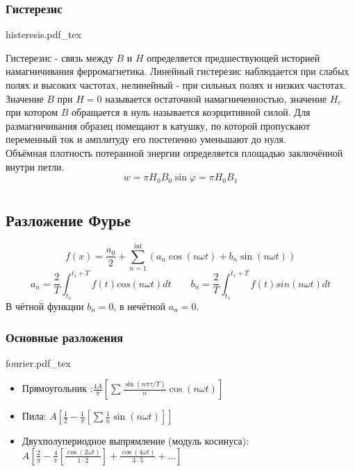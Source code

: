 \documentclass{article}
\newcommand{\incfig}[2][1]{%
    \def\svgwidth{#1\columnwidth}
    {#2.pdf_tex}
}
\begin{document}
\subsubsection{Гистерезис}
\incfig{histeresis}
Гистерезис - связь между $B$ и $H$ определяется предшествующей историей намагничивания ферромагнетика.
Линейный гистерезис наблюдается при слабых полях и высоких частотах, нелинейный - при сильных полях и низких частотах.
Значение $B$ при $H=0$ называется остаточной намагниченностью, значение $H_c$ при котором $B$ обращается в нуль называется коэрцитивной силой.
Для размагничивания образец помещают в катушку, по которой пропускают переменный ток и амплитуду его постепенно уменьшают до нуля.\\
Объёмная плотность потеранной энергии определяется площадью заключённой внутри петли.
\[w=\pi H_0B_0 \sin \varphi=\pi H_0B_1\]

\section{}
\subsection{Разложение Фурье}
\[f(x)=\frac{a_0}{2} + \sum_{n=1}^{\inf}(a_n \cos (n \omega t) + b_n \sin (n \omega t))\]
\[a_n = \frac{2}{T}\int_{t_1}^{t_1+T}f(t)cos(n\omega t)dt \qquad b_n = \frac{2}{T}\int_{t_1}^{t_1+T}f(t)sin(n\omega t)dt\]
В чётной функции $b_n=0$, в нечётной $a_n=0$.
\subsubsection{Основные разложения}
\incfig{fourier}
\begin{itemize}
    \item Прямоугольник :$\frac{4A}{\pi}[\sum\frac{\sin(n\pi\tau/T)}{n}\cos(n\omega t)]$
    \item Пила: $A[\frac{1}{2}-\frac{1}{\pi}[\sum \frac{1}{n} \sin(n\omega t)]]$
    \item Двухполупериодное выпрямление (модуль косинуса): \\ $A[\frac{2}{\pi}-\frac{4}{\pi}[\frac{\cos(2\omega t)}{1\cdot2}] + \frac{\cos(4\omega t)}{3\cdot5} + ...]$
\end{itemize}
\end{document}
